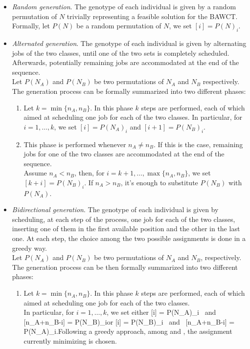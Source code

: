 \documentclass[opre,nonblindrev]{informs3} %
\begin{document}
\begin{itemize}
	\item \textit{Random generation}. The genotype of each individual is given by a random permutation of $N$ trivially representing a feasible solution for the BAWCT. Formally, let $P(N)$ be a random permutation of $N$, we set $[i] =  P(N)_i$. 
	\item \textit{Alternated generation}. The genotype of each individual is given by alternating jobs of the two classes, until one of the two sets is completely scheduled. Afterwards, potentially remaining jobs are accommodated at the end of the sequence.\\
	 Let $P(N_A)$ and $P(N_B)$ be two permutations of $N_A$ and $N_B$ respectively. The generation process can be formally summarized into two different phases:
	\begin{enumerate}
		\item Let $k = \min\{n_A,n_B\}$. In this phase $k$ steps are performed, each of which aimed at scheduling one job for each of the two classes. In particular, for $i=1,\ldots,k$, we set $[i] = P(N_A)_i$ and $[i+1] = P(N_B)_i$.
		\item This phase is performed whenever $n_A \ne n_B$. If this is the case, remaining jobs for one of the two classes are accommodated at the end of the sequence.\\ Assume $n_A<n_B$, then, for $i=k+1,\ldots,\max\{n_A,n_B\}$, we set $[k+i] = P(N_B)_i.$ If $n_A>n_B$, it's enough to substitute $P(N_B)$ with $P(N_A)$. 
	\end{enumerate}
	\item \textit{Bidirectional generation}. The genotype of each individual is given by scheduling, at each step of the process, one job for each of the two classes, inserting one of them in the first available position and the other in the last one. At each step, the choice among the two possible assignments is done in a greedy way.\\
	Let $P(N_A)$ and $P(N_B)$ be two permutations of $N_A$ and $N_B$, respectively. The generation process can be then formally summarized into two different phases:
	\begin{enumerate}
		\item Let $k = \min\{n_A,n_B\}$. In this phase $k$ steps are performed, each of which aimed at scheduling one job for each of the two classes.\\ In particular, for $i=1,\ldots,k$, we set either \be \label{eq1}[i] = P(N_A)_i \mbox{ and } [n_A+n_B-i] = P(N_B)_i\ee or \be \label{eq2}[i] = P(N_B)_i \mbox{ and } [n_A+n_B-i] = P(N_A)_i.\ee Following a greedy approach, among  and , the assignment currently minimizing  is chosen.  

\end{enumerate}
\end{itemize}
\end{document}
